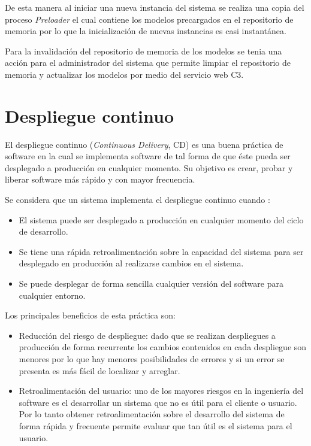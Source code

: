 De esta manera al iniciar una nueva instancia del sistema se realiza una copia del
proceso \textit{Preloader} el cual contiene los modelos precargados en el
repositorio de memoria por lo que la inicialización de nuevas instancias es casi
instantánea.


Para la invalidación del repositorio de memoria de los modelos se tenia una acción
para el administrador del sistema que permite limpiar el repositorio de memoria y
actualizar los modelos por medio del servicio web C3.



\section{Despliegue continuo}

El despliegue continuo (\textit{Continuous Delivery}, CD) es una buena práctica de
software en la cual se implementa software de tal forma de que éste pueda ser
desplegado a producción en cualquier momento\cite{27_martin_fowler_cd}. Su objetivo
es crear, probar y liberar software más rápido y con mayor frecuencia.

\vspace{2.5mm}

Se considera que un sistema implementa el despliegue continuo cuando
\cite{27_martin_fowler_cd}:
\begin{itemize}
\item El sistema puede ser desplegado a producción en cualquier momento del
  ciclo de desarrollo.
\item Se tiene una rápida retroalimentación sobre la capacidad del sistema
  para ser desplegado en producción al realizarse cambios en el sistema.
\item Se puede desplegar de forma sencilla cualquier versión del software para
  cualquier entorno.
\end{itemize}

Los principales beneficios de esta práctica son:
\begin{itemize}
\item Reducción del riesgo de despliegue: dado que se realizan despliegues
  a producción de forma recurrente los cambios contenidos en cada despliegue
  son menores por lo que hay menores posibilidades de errores y si un error
  se presenta es más fácil de localizar y arreglar.
\item Retroalimentación del usuario: uno de los mayores riesgos en la ingeniería
  del software es el desarrollar un sistema que no es útil para el cliente o usuario.
  Por lo tanto obtener retroalimentación sobre el desarrollo del sistema de forma
  rápida y frecuente permite evaluar que tan útil es el sistema para el usuario.
\end{itemize}

